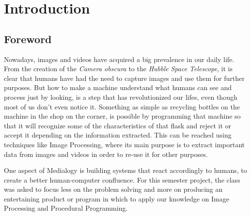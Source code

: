 \chapter{Introduction}
\section{Foreword}
Nowadays, images and videos have acquired a big prevalence in our daily life. From the creation of the \textit{Camera obscura} to the \textit{Hubble Space Telescope}, it is clear that humans have had the need to capture images and use them for further purposes. But how to make a machine understand what humans can see and process just by looking, is a step that has revolutionized our lifes, even though most of us don't even notice it. Something as simple as recycling bottles on the machine in the shop on the corner, is possible by programming that machine so that it will recognize some of the characteristics of that flask and reject it or accept it depending on the information extracted. This can be reached using techniques like Image Processing, where its main purpose is to extract important data from images and videos in order to re-use it for other purposes.

One aspect of Medialogy is building systems that react accordingly to humans, to create a better human-computer confluence. For this semester project, the class was asked to focus less on the problem solving and more on producing an entertaining product or program in which to apply our knowledge on Image Processing and Procedural Programming.




